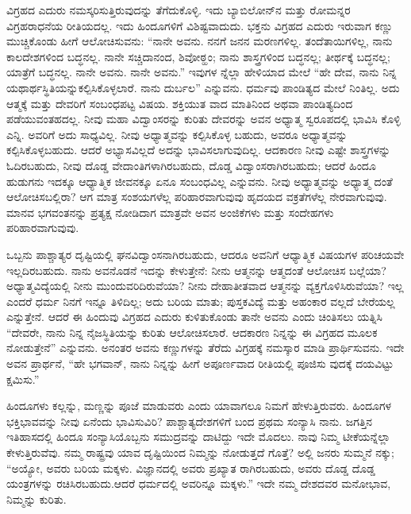 ವಿಗ್ರಹದ ಎದುರು ನಮಸ್ಕರಿಸುತ್ತಿರುವುದನ್ನು ತೆಗೆದುಕೊಳ್ಳಿ. ಇದು ಬ್ಯಾಬಿಲೋನ್​ನ ಮತ್ತು ರೋಮನ್ನರ ವಿಗ್ರಹರಾಧನೆಯ ರೀತಿಯದಲ್ಲ. ಇದು ಹಿಂದೂಗಳಿಗೆ ವಿಶಿಷ್ಟವಾದುದು. ಭಕ್ತನು ವಿಗ್ರಹದ ಎದುರು ಇರುವಾಗ ಕಣ್ಣು ಮುಚ್ಚಿಕೊಂಡು ಹೀಗೆ ಆಲೋಚಿಸುವನು: “ನಾನೇ ಅವನು. ನನಗೆ ಜನನ ಮರಣಗಳಿಲ್ಲ. ತಂದೆತಾಯಿಗಳಿಲ್ಲ, ನಾನು ಕಾಲದೇಶಗಳಿಂದ ಬದ್ಧನಲ್ಲ. ನಾನೇ ಸಚ್ಚಿದಾನಂದ, ಶಿವೋಠ್ಹಂ; ನಾನು ಶಾಸ್ತ್ರಗಳಿಂದ ಬದ್ಧನಲ್ಲ; ತೀರ್ಥಕ್ಕೆ ಬದ್ಧನಲ್ಲ; ಯಾತ್ರೆಗೆ ಬದ್ಧನಲ್ಲ. ನಾನೇ ಅವನು. ನಾನೇ ಅವನು.” ಇವುಗಳ ನ್ನೆಲ್ಲಾ ಹೇಳಿಯಾದ ಮೇಲೆ “ಹೇ ದೇವ, ನಾನು ನಿನ್ನ ಯಥಾರ್ಥಸ್ಥಿತಿಯನ್ನುಕಲ್ಪಿಸಿಕೊಳ್ಳಲಾರೆ. ನಾನು ದುರ್ಬಲ” ಎನ್ನುವನು. ಧರ್ಮವು ಪಾಂಡಿತ್ಯದ ಮೇಲೆ ನಿಂತಿಲ್ಲ. ಅದು ಆತ್ಮಕ್ಕೆ ಮತ್ತು ದೇವರಿಗೆ ಸಂಬಂಧಪಟ್ಟ ವಿಷಯ. ಶಕ್ತಿಯುತ ವಾದ ಮಾತಿನಿಂದ ಅಥವಾ ಪಾಂಡಿತ್ಯದಿಂದ ಪಡೆಯುವಂತಹದಲ್ಲ. ನೀವು ಮಹಾ ವಿದ್ವಾಂಸರನ್ನು ಕುರಿತು ದೇವರನ್ನು ಅವನ ಅಧ್ಯಾತ್ಮ ಸ್ವರೂಪದಲ್ಲಿ ಭಾವಿಸಿ ಕೊಳ್ಳಿ ಎನ್ನಿ. ಅವರಿಗೆ ಅದು ಸಾಧ್ಯವಿಲ್ಲ. ನೀವು ಅಧ್ಯಾತ್ಮವನ್ನು ಕಲ್ಪಿಸಿಕೊಳ್ಳ ಬಹುದು, ಅವರೂ ಅಧ್ಯಾತ್ಮವನ್ನು ಕಲ್ಪಿಸಿಕೊಳ್ಳಬಹುದು. ಆದರೆ ಅಭ್ಯಾಸವಿಲ್ಲದೆ ಅದನ್ನು ಭಾವಿಸಲಾಗುವುದಿಲ್ಲ. ಆದಕಾರಣ ನೀವು ಎಷ್ಟೇ ಶಾಸ್ತ್ರಗಳನ್ನು ಓದಿರಬಹುದು, ನೀವು ದೊಡ್ಡ ವೇದಾಂತಿಗಳಾಗಿರಬಹುದು, ದೊಡ್ಡ ವಿದ್ವಾಂಸರಾಗಿರಬಹುದು; ಆದರೆ ಹಿಂದೂ ಹುಡುಗನು ಇದಕ್ಕೂ ಆಧ್ಯಾತ್ಮಿಕ ಜೀವನಕ್ಕೂ ಏನೂ ಸಂಬಂಧವಿಲ್ಲ ಎನ್ನುವನು. ನೀವು ಅಧ್ಯಾತ್ಮವನ್ನು ಅಧ್ಯಾತ್ಮ ದಂತೆ ಆಲೋಚಿಸಬಲ್ಲಿರಾ? ಆಗ ಮಾತ್ರ ಸಂಶಯಗಳೆಲ್ಲ ಪರಿಹಾರವಾಗುವುವು ಹೃದಯದ ವಕ್ರತೆಗಳೆಲ್ಲ ನೇರವಾಗುವುವು. ಮಾನವ ಭಗವಂತನನ್ನು ಪ್ರತ್ಯಕ್ಷ ನೋಡಿದಾಗ ಮಾತ್ರವೇ ಅವನ ಅಂಜಿಕೆಗಳು ಮತ್ತು ಸಂದೇಹಗಳು ಪರಿಹಾರವಾಗುವುವು.

ಒಬ್ಬನು ಪಾಶ್ಚಾತ್ಯರ ದೃಷ್ಟಿಯಲ್ಲಿ ಘನವಿದ್ವಾಂಸನಾಗಿರಬಹುದು, ಆದರೂ ಅವನಿಗೆ ಆಧ್ಯಾತ್ಮಿಕ ವಿಷಯಗಳ ಪರಿಚಯವೇ ಇಲ್ಲದಿರಬಹುದು. ನಾನು ಅವನೊಡನೆ ಇದನ್ನು ಕೇಳುತ್ತೇನೆ: ನೀನು ಆತ್ಮನನ್ನು ಆತ್ಮದಂತೆ ಆಲೋಚಿಸ ಬಲ್ಲೆಯಾ? ಅಧ್ಯಾತ್ಮವಿದ್ಯೆಯಲ್ಲಿ ನೀನು ಮುಂದುವರಿದಿರುವೆಯಾ? ನೀನು ದೇಹಾತೀತವಾದ ಆತ್ಮನನ್ನು ವ್ಯಕ್ತಗೊಳಿಸಿರುವೆಯಾ? ಇಲ್ಲ ಎಂದರೆ ಧರ್ಮ ನಿನಗೆ ಇನ್ನೂ ತಿಳಿದಿಲ್ಲ; ಅದು ಬರಿಯ ಮಾತು; ಪುಸ್ತಕವಿದ್ಯೆ ಮತ್ತು ಅಹಂಕಾರ ವಲ್ಲದೆ ಬೇರೆಯಲ್ಲ ಎನ್ನುತ್ತೇನೆ. ಆದರೆ ಈ ಹಿಂದುವು ವಿಗ್ರಹದ ಎದುರು ಕುಳಿತುಕೊಂಡು ತಾನೇ ಅವನು ಎಂದು ಚಿಂತಿಸಲು ಯತ್ನಿಸಿ “ದೇವರೇ, ನಾನು ನಿನ್ನ ನೈಜಸ್ಥಿತಿಯನ್ನು ಕುರಿತು ಆಲೋಚಿಸಲಾರೆ. ಆದಕಾರಣ ನಿನ್ನನ್ನು ಈ ವಿಗ್ರಹದ ಮೂಲಕ ನೋಡುತ್ತೇನೆ” ಎನ್ನುವನು. ಅನಂತರ ಅವನು ಕಣ್ಣುಗಳನ್ನು ತೆರೆದು ವಿಗ್ರಹಕ್ಕೆ ನಮಸ್ಕಾರ ಮಾಡಿ ಪ್ರಾರ್ಥಿಸುವನು. ಇದೇ ಅವನ ಪ್ರಾರ್ಥನೆ, “ಹೇ ಭಗವಾನ್​, ನಾನು ನಿನ್ನನ್ನು ಹೀಗೆ ಅಪೂರ್ಣವಾದ ರೀತಿಯಲ್ಲಿ ಪೂಜಿಸು ವುದಕ್ಕೆ ದಯವಿಟ್ಟು ಕ್ಷಮಿಸು.”

ಹಿಂದೂಗಳು ಕಲ್ಲನ್ನು, ಮಣ್ಣನ್ನು ಪೂಜೆ ಮಾಡುವರು ಎಂದು ಯಾವಾಗಲೂ ನಿಮಗೆ ಹೇಳುತ್ತಿರುವರು. ಹಿಂದೂಗಳ ಭಕ್ತಿಭಾವವನ್ನು ನೀವು ಏನೆಂದು ಭಾವಿಸುವಿರಿ? ಪಾಶ್ಚಾತ್ಯದೇಶಗಳಿಗೆ ಬಂದ ಪ್ರಥಮ ಸಂನ್ಯಾಸಿ ನಾನು. ಜಗತ್ತಿನ ಇತಿಹಾಸದಲ್ಲಿ ಹಿಂದೂ ಸಂನ್ಯಾಸಿಯೊಬ್ಬನು ಸಮುದ್ರವನ್ನು ದಾಟಿದ್ದು ಇದೇ ಮೊದಲು. ನಾವು ನಿಮ್ಮ ಟೀಕೆಯನ್ನೆಲ್ಲಾ ಕೇಳುತ್ತಿರುವೆವು. ನಮ್ಮ ರಾಷ್ಟ್ರವು ಯಾವ ದೃಷ್ಟಿಯಿಂದ ನಿಮ್ಮನ್ನು ನೋಡುತ್ತದೆ ಗೊತ್ತೆ? ಅಲ್ಲಿ ಜನರು ಸುಮ್ಮನೆ ನಕ್ಕು; “ಅಯ್ಯೋ, ಅವರು ಬರಿಯ ಮಕ್ಕಳು. ವಿಜ್ಞಾನದಲ್ಲಿ ಅವರು ಪ್ರಖ್ಯಾತ ರಾಗಿರಬಹುದು, ಅವರು ದೊಡ್ಡ ದೊಡ್ಡ ಯಂತ್ರಗಳನ್ನು ರಚಿಸಿರಬಹುದು.ಆದರೆ ಧರ್ಮದಲ್ಲಿ ಅವರಿನ್ನೂ ಮಕ್ಕಳು.” ಇದೇ ನಮ್ಮ ದೇಶದವರ ಮನೋಭಾವ, ನಿಮ್ಮನ್ನು ಕುರಿತು.

